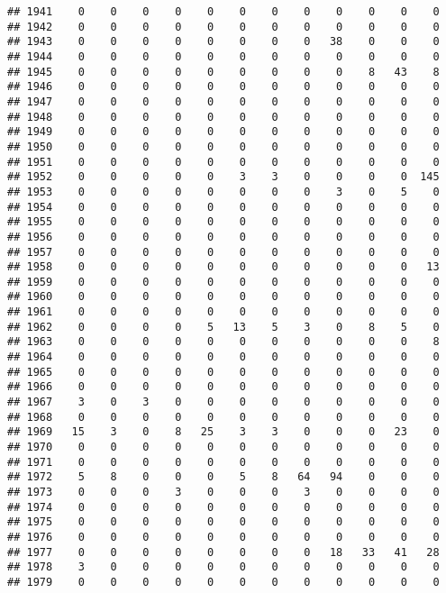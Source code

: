 \documentclass[]{article}
\begin{document}
\begin{verbatim}
## 1941    0    0    0    0    0    0    0    0    0    0    0    0
## 1942    0    0    0    0    0    0    0    0    0    0    0    0
## 1943    0    0    0    0    0    0    0    0   38    0    0    0
## 1944    0    0    0    0    0    0    0    0    0    0    0    0
## 1945    0    0    0    0    0    0    0    0    0    8   43    8
## 1946    0    0    0    0    0    0    0    0    0    0    0    0
## 1947    0    0    0    0    0    0    0    0    0    0    0    0
## 1948    0    0    0    0    0    0    0    0    0    0    0    0
## 1949    0    0    0    0    0    0    0    0    0    0    0    0
## 1950    0    0    0    0    0    0    0    0    0    0    0    0
## 1951    0    0    0    0    0    0    0    0    0    0    0    0
## 1952    0    0    0    0    0    3    3    0    0    0    0  145
## 1953    0    0    0    0    0    0    0    0    3    0    5    0
## 1954    0    0    0    0    0    0    0    0    0    0    0    0
## 1955    0    0    0    0    0    0    0    0    0    0    0    0
## 1956    0    0    0    0    0    0    0    0    0    0    0    0
## 1957    0    0    0    0    0    0    0    0    0    0    0    0
## 1958    0    0    0    0    0    0    0    0    0    0    0   13
## 1959    0    0    0    0    0    0    0    0    0    0    0    0
## 1960    0    0    0    0    0    0    0    0    0    0    0    0
## 1961    0    0    0    0    0    0    0    0    0    0    0    0
## 1962    0    0    0    0    5   13    5    3    0    8    5    0
## 1963    0    0    0    0    0    0    0    0    0    0    0    8
## 1964    0    0    0    0    0    0    0    0    0    0    0    0
## 1965    0    0    0    0    0    0    0    0    0    0    0    0
## 1966    0    0    0    0    0    0    0    0    0    0    0    0
## 1967    3    0    3    0    0    0    0    0    0    0    0    0
## 1968    0    0    0    0    0    0    0    0    0    0    0    0
## 1969   15    3    0    8   25    3    3    0    0    0   23    0
## 1970    0    0    0    0    0    0    0    0    0    0    0    0
## 1971    0    0    0    0    0    0    0    0    0    0    0    0
## 1972    5    8    0    0    0    5    8   64   94    0    0    0
## 1973    0    0    0    3    0    0    0    3    0    0    0    0
## 1974    0    0    0    0    0    0    0    0    0    0    0    0
## 1975    0    0    0    0    0    0    0    0    0    0    0    0
## 1976    0    0    0    0    0    0    0    0    0    0    0    0
## 1977    0    0    0    0    0    0    0    0   18   33   41   28
## 1978    3    0    0    0    0    0    0    0    0    0    0    0
## 1979    0    0    0    0    0    0    0    0    0    0    0    0

\end{verbatim}
\end{document}
